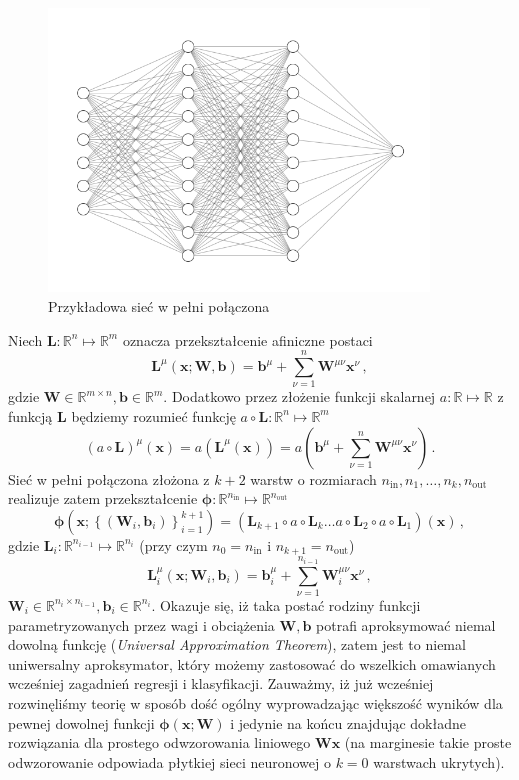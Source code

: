 \documentclass{myclass}
\numberwithin{equation}{subsection}
\begin{document}
\begin{figure}[ht]
    \centering
    \includegraphics[width=0.9\textwidth]{figs/fcn.png}
    \caption{Przykładowa sieć w pełni połączona}
    \label{fig:fcn}
\end{figure}

Niech \(\bm{L}: \mathbb{R}^{n} \mapsto \mathbb{R}^{m}\) oznacza przekształcenie afiniczne postaci
\[
\bm{L}^\mu(\bm{x}; \bm{W}, \bm{b}) = \bm{b}^\mu + \sum_{\nu=1}^{n} \bm{W}^{\mu\nu}\bm{x}^\nu\,,
\]
gdzie \(\bm{W} \in \mathbb{R}^{m \times n}, \bm{b} \in \mathbb{R}^m\). Dodatkowo przez złożenie
funkcji skalarnej \(a: \mathbb{R} \mapsto \mathbb{R}\) z funkcją \(\bm{L}\) będziemy rozumieć
funkcję \(a \circ \bm{L} : \mathbb{R}^n \mapsto \mathbb{R}^m\)
\[
(a \circ \bm{L})^\mu (\bm{x}) = a\left(\bm{L}^\mu(\bm{x})\right) = a\left(\bm{b}^\mu + \sum_{\nu=1}^{n} \bm{W}^{\mu\nu}\bm{x}^\nu\right)\,.
\]
Sieć w pełni połączona złożona z \(k+2\) warstw o rozmiarach \(n_\text{in}, n_1, \ldots, n_k,
n_\text{out}\) realizuje zatem przekształcenie \(\bm{\phi}: \mathbb{R}^{n_\text{in}} \mapsto
\mathbb{R}^{n_\text{out}}\)
\[
\boxed
{
\bm{\phi}\left(\bm{x}; \left\{(\bm{W}_i, \bm{b}_i)\right\}_{i=1}^{k+1}\right) = \left( \bm{L}_{k+1} \circ a \circ \bm{L}_k \ldots a \circ \bm{L}_2 \circ a \circ \bm{L}_1 \right) (\bm{x}) \,,
}
\]
gdzie \(\bm{L}_i : \mathbb{R}^{n_{i-1}} \mapsto \mathbb{R}^{n_i}\) (przy czym \(n_0 = n_\text{in}\)
i \(n_{k+1} = n_\text{out}\))
\[
\boxed
{
\bm{L}_i^\mu \left(\bm{x}; \bm{W}_i, \bm{b}_i\right) = \bm{b}_i^\mu + \sum_{\nu=1}^{n_{i-1}} \bm{W}_i^{\mu\nu}\bm{x}^\nu\,,
}
\]
\(\bm{W}_i \in \mathbb{R}^{n_i \times n_{i-1}}, \bm{b}_i \in \mathbb{R}^{n_i}\). Okazuje się, iż
taka postać rodziny funkcji parametryzowanych przez wagi i obciążenia \(\bm{W}, \bm{b}\) potrafi
aproksymować niemal dowolną funkcję (\textit{Universal Approximation Theorem}), zatem jest to niemal
uniwersalny aproksymator, który możemy zastosować do wszelkich omawianych wcześniej zagadnień
regresji i klasyfikacji. Zauważmy, iż już wcześniej rozwinęliśmy teorię w sposób dość ogólny
wyprowadzając większość wyników dla pewnej dowolnej funkcji \(\bm{\phi}(\bm{x}; \bm{W})\) i jedynie
na końcu znajdując dokładne rozwiązania dla prostego odwzorowania liniowego \(\bm{W}\bm{x}\) (na
marginesie takie proste odwzorowanie odpowiada płytkiej sieci neuronowej o \(k=0\) warstwach
ukrytych).
\end{document}
